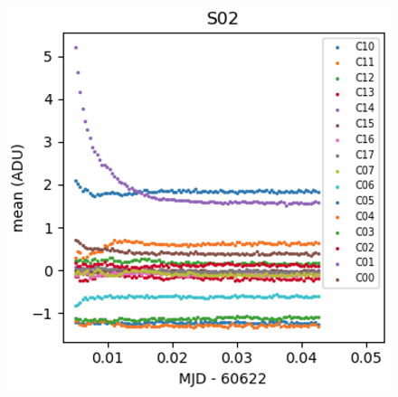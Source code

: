 \begin{figure}[htbp]
\begin{minipage}[b]{0.45\textwidth}
    \includegraphics[width=\textwidth]{figures/E2236_R33_S02.png}
\end{minipage}

\vspace{0.05\textwidth}


\end{figure}
